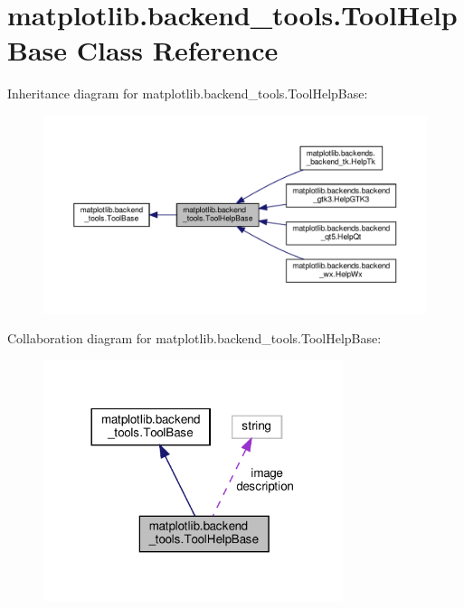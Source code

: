 \hypertarget{classmatplotlib_1_1backend__tools_1_1ToolHelpBase}{}\section{matplotlib.\+backend\+\_\+tools.\+Tool\+Help\+Base Class Reference}
\label{classmatplotlib_1_1backend__tools_1_1ToolHelpBase}


Inheritance diagram for matplotlib.\+backend\+\_\+tools.\+Tool\+Help\+Base\+:
\nopagebreak
\begin{figure}[H]
\begin{center}
\leavevmode
\includegraphics[width=350pt]{classmatplotlib_1_1backend__tools_1_1ToolHelpBase__inherit__graph}
\end{center}
\end{figure}


Collaboration diagram for matplotlib.\+backend\+\_\+tools.\+Tool\+Help\+Base\+:
\nopagebreak
\begin{figure}[H]
\begin{center}
\leavevmode
\includegraphics[width=248pt]{classmatplotlib_1_1backend__tools_1_1ToolHelpBase__coll__graph}
\end{center}
\end{figure}
